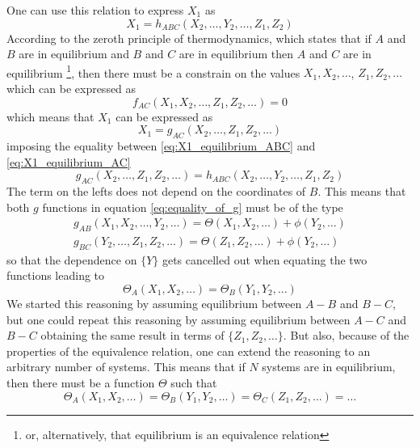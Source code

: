One can use this relation to express $X_1$ as 
\begin{equation}
    X_1 = h_{ABC}(X_2, \dots, Y_2, \dots, Z_1, Z_2)
    \label{eq:X1_equilibrium_ABC}
\end{equation}
According to the zeroth principle of thermodynamics, which states that if $A$ and $B$ are in equilibrium and $B$ and $C$ are in equilibrium then $A$ and $C$ are in equilibrium 
\footnote{or, alternatively, that equilibrium is an equivalence relation}, then
there must be a constrain on the values ${X_1, X_2, \dots}$, ${Z_1, Z_2, \dots}$ which can be expressed as 
\begin{equation*}
    f_{AC} (X_1, X_2, \dots, Z_1, Z_2, \dots) = 0
\end{equation*}
which means that $X_1$ can be expressed as
\begin{equation}
    X_1 = g_{AC} (X_2, \dots, Z_1, Z_2, \dots)
    \label{eq:X1_equilibrium_AC}
\end{equation}
imposing the equality between \ref{eq:X1_equilibrium_ABC} and \ref{eq:X1_equilibrium_AC}
\begin{equation*}
    g_{AC} (X_2, \dots, Z_1, Z_2, \dots) = h_{ABC}(X_2, \dots, Y_2, \dots, Z_1, Z_2)
\end{equation*}
The term on the lefts does not depend on the coordinates of $B$. This means that both $g$ functions in equation \ref{eq:equality_of_g} must be of the type
\begin{gather*}
    g_{AB}(X_1, X_2, \dots, Y_2, \dots) = \Theta(X_1, X_2, \dots) + \phi(Y_2, \dots) \\
    g_{BC}(Y_2, \dots, Z_1, Z_2, \dots) = \Theta(Z_1, Z_2, \dots) + \phi(Y_2, \dots)
\end{gather*}
so that the dependence on $\{Y\}$ gets cancelled out when equating the two functions leading to 
\begin{equation*}
    \Theta_A(X_1, X_2, \dots) = \Theta_B(Y_1, Y_2, \dots)
\end{equation*}
We started this reasoning by assuming equilibrium between $A-B$ and $B-C$, but one could repeat this reasoning by assuming
equilibrium between $A-C$ and $B-C$ obtaining the same result in terms of $\{Z_1, Z_2, \dots\}$. But also, because of the properties of the equivalence relation,
one can extend the reasoning to an arbitrary number of systems. This means that if $N$ systems are in equilibrium, then there must be a function $\Theta$ such that
\begin{equation*}
    \Theta_A(X_1, X_2, \dots) = \Theta_B(Y_1, Y_2, \dots) = \Theta_C(Z_1, Z_2, \dots) = \dots
\end{equation*}
